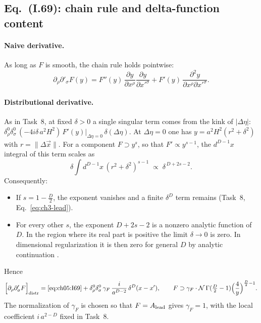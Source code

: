 \subsection[Eq. (I.69): chain rule and delta-function content]{Eq.~(I.69): chain rule and delta-function content \tD}
\label{sec:ch05:t11:69}

\paragraph{Naive derivative.}
As long as $F$ is smooth, the chain rule holds pointwise:
\begin{equation}
\partial_\rho\partial'_\sigma F(y)=F''(y)\,\frac{\partial y}{\partial x^\rho}\frac{\partial y}{\partial x'^\sigma}+F'(y)\,\frac{\partial^2y}{\partial x^\rho\partial x'^\sigma}.
\tag{I.69}\label{eq:ch05:I69}
\end{equation}

\paragraph{Distributional derivative.}
As in Task~8, at fixed $\delta>0$ a single singular term comes from the kink of $|\Delta\eta|$:
$\delta^0_\rho\delta^0_\sigma\,(-4i\delta\,a^2H^2)\,F'(y)\big|_{\Delta\eta=0}\,\delta(\Delta\eta)$.
At $\Delta\eta=0$ one has $y=a^2H^2(r^2+\delta^2)$ with $r=\|\Delta\vec x\|$.
For a component $F\supset y^s$, so that $F'\propto y^{s-1}$, the $d^{D-1}x$ integral of this term scales as
\begin{equation}
\delta\int d^{D-1}x\,(r^2+\delta^2)^{s-1}\;\propto\;\delta^{\,D+2s-2}.
\label{eq:ch05:t11:scaling}
\end{equation}
Consequently:
\begin{itemize}[leftmargin=14pt]
\item If $s=1-\frac D2$, the exponent vanishes and a finite $\delta^D$ term remains (Task~8, Eq.~\eqref{eq:ch3-lead}).
\item For every other $s$, the exponent $D+2s-2$ is a nonzero analytic function of $D$. In the region where its real part is positive the limit $\delta\to0$ is zero.
In dimensional regularization it is then zero for general $D$ by analytic continuation \tA.
\end{itemize}
Hence
\begin{equation}
\Big[\partial_\rho\partial'_\sigma F\Big]_{\rm distr}=\eqref{eq:ch05:I69}+\delta^0_\rho\delta^0_\sigma\,\gamma_F\,\frac{i}{a^{D-2}}\,\delta^D(x-x'),
\qquad F\supset\gamma_F\cdot\mathcal N\,\Gamma(\tfrac D2-1)\Big(\frac4y\Big)^{\frac D2-1}.
\label{eq:ch05:t11:distr}
\end{equation}
The normalization of $\gamma_F$ is chosen so that $F=A_{\rm lead}$ gives $\gamma_F=1$, with the local coefficient $i\,a^{2-D}$ fixed in Task~8.

